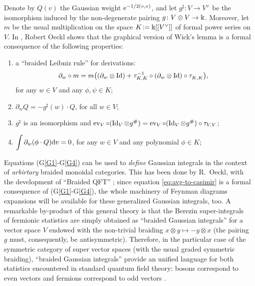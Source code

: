 \begin{remark}
  Denote by $Q(v)$ the Gaussian weight \(\mathrm{e}^{-1/2(v,v)}\), and let
  \(g^\sharp\colon V\to V^\lor\) be the isomorphism induced by the
  non-degenerate pairing \(g\colon V\otimes V\to\Bbbk\). Moreover, let
  \(m\) be the usual multiplication on the space \(K \joinrel:=
  \fk[[V^\lor]]\) of formal power series on \(V\).  In
  \cite{oeckl;braided-qft}, Robert Oeckl shows that the graphical
  version of Wick's lemma is a formal consequence of the following
  properties:
\begin{enumerate}[(G1)]
\item\label{G1} a ``braided Leibniz rule'' for derivations:
\[\partial_w\circ m=m\bigl((\partial_w\otimes
\operatorname{Id})+\tau^{-1}_{K, K}\circ(\partial_w\otimes\operatorname{Id}) \circ \tau^{}_{K,
  K}\bigr),\] for any \(w\in V\) and any \(\phi, \psi\in K\);
\item\label{G2} \(\partial_w Q = -g^\sharp(w)\cdot Q\), for all \(w\in V\);
\item\label{G3} \(g^\sharp\) is an isomorphism and
\(\operatorname{ev}_V\circ(\operatorname{Id}_V\otimes g^\#)=\operatorname{ev}_V\circ(\operatorname{Id}_V\otimes
g^\#)\circ\tau_{V,V}\);
\item\label{G4} 
\(\displaystyle{\int\partial_w(\phi\cdot Q)\mathrm{d}v=0}\), for
  any \(w\in V\) and any polynomial \(\phi\in K\);
\end{enumerate}
Equations (G\ref{G1}-G\ref{G4}) can be used to \emph{define} Gaussian
integrals in the context of \emph{arbirtary} braided monoidal categories.
This has been done by R.~Oeckl, with the development of ``Braided
QFT'' \cite{oeckl;braided-qft}; since equation
\eqref{eq:avg-to-casimir} is a formal consequence of   
(G\ref{G1}-G\ref{G4}), the whole machinery of Feynman diagrams expansions
will be available for these generalized Gaussian integrals, too.
A remarkable by-product of this general
theory is that the Berezin super-integrals of fermionic statistics are
simply obtained as ``braided
Gaussian integrals'' for a vector space \(V\) endowed with the non-trivial
braiding \(x\otimes y\mapsto -y\otimes x\) (the pairing \(g\) must,
consequently, be antisymmetric). Therefore, in the particular case
of the symmetric category of super vector spaces (with the usual graded
symmetric braiding), ``braided Gaussian integrals'' provide an unified
language for both statistics encountered in standard quantum field theory:
bosons correspond to even vectors and fermions correspond to odd vectors
\cite[Sections~3.3 and~3.4]{oeckl;spin-and-statistics}.
\end{remark}
